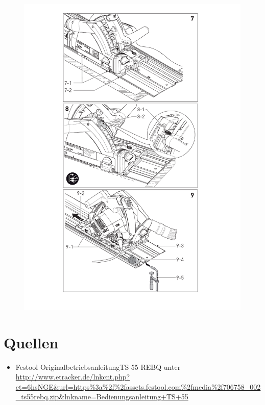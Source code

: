 \documentclass{\basedir/fablab-document}
\begin{document}
\begin{figure}[H]
	\centering
	\includegraphics[width=1\textwidth]{img/festool_bilder_2Teil2.pdf}
	\caption{}
	\label{fig:gehaeuse_oben}
\end{figure}


\newpage
\section{Quellen}
\begin{itemize}
\item Festool \glqq Originalbetriebsanleitung\grqq TS 55 REBQ unter 
\url{http://www.etracker.de/lnkcnt.php?et=6hsNGE&url=https\%3a\%2f\%2fassets.festool.com\%2fmedia\%2f706758_002_ts55rebq.zip&lnkname=Bedienungsanleitung+TS+55}
\end{itemize}
\end{document}
